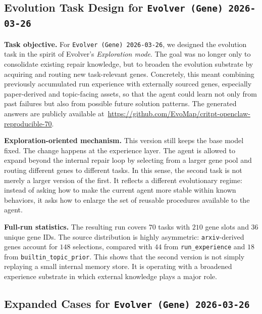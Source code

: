 \documentclass{article}
\newcommand{\nbf}[1]{{\noindent \textbf{#1}}}
\begin{document}
\subsection{Evolution Task Design for \texttt{Evolver (Gene) 2026-03-26}}
\label{app:second_run_design}

\nbf{Task objective.}
For \texttt{Evolver (Gene) 2026-03-26}, we designed the evolution task in the spirit of Evolver's \emph{Exploration mode}.
The goal was no longer only to consolidate existing repair knowledge, but to broaden the evolution substrate by acquiring and routing new task-relevant genes.
Concretely, this meant combining previously accumulated run experience with externally sourced genes, especially paper-derived and topic-facing assets, so that the agent could learn not only from past failures but also from possible future solution patterns.
The generated answers are publicly available at~\url{https://github.com/EvoMap/critpt-openclaw-reproducible-70}.

\nbf{Exploration-oriented mechanism.}
This version still keeps the base model fixed.
The change happens at the experience layer.
The agent is allowed to expand beyond the internal repair loop by selecting from a larger gene pool and routing different genes to different tasks.
In this sense, the second task is not merely a larger version of the first.
It reflects a different evolutionary regime: instead of asking how to make the current agent more stable within known behaviors, it asks how to enlarge the set of reusable procedures available to the agent.

\nbf{Full-run statistics.}
The resulting run covers $70$ tasks with $210$ gene slots and $36$ unique gene IDs.
The source distribution is highly asymmetric:
\texttt{arxiv}-derived genes account for $148$ selections, compared with $44$ from \texttt{run\_experience} and $18$ from \texttt{builtin\_topic\_prior}.
This shows that the second version is not simply replaying a small internal memory store.
It is operating with a broadened experience substrate in which external knowledge plays a major role.

\subsection{Expanded Cases for \texttt{Evolver (Gene) 2026-03-26}}
\label{app:second_run_cases}
\end{document}
